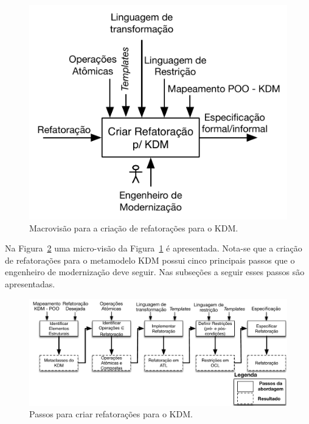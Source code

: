 \begin{figure}[h]
	\centering
	\caption{Macrovisão para a criação de refatorações para o KDM.}
	\label{fig:diretrizes_kdm_refatoracao_capitulo}
	\includegraphics[scale=0.9]{images/novoMacroAbordagemKDMRefactoring2}
	\fautor
\end{figure}


Na Figura~\ref{fig:todos_os_passos_diretrizes} uma micro-visão da Figura~\ref{fig:diretrizes_kdm_refatoracao_capitulo} é apresentada. Nota-se que a criação de refatorações para o metamodelo KDM possui cinco principais passos que o engenheiro de modernização deve seguir. Nas subseções a seguir esses passos são apresentadas. %


\begin{figure}[h]
	\centering
	\caption{Passos para criar refatorações para o KDM.}
	\label{fig:todos_os_passos_diretrizes}
	\includegraphics[scale=0.7]{images/novaAbordagemCriarRefatoracao3}
	\fautor
\end{figure}

